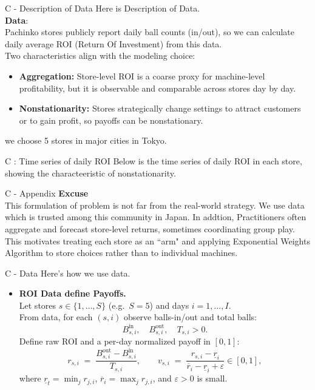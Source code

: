 \documentclass{beamer}
\begin{document}
\begin{frame}{C - Description of Data}
Here is Description of Data.\\
\textbf{Data}:\\
Pachinko stores publicly report daily ball counts (in/out), so we can calculate daily average ROI (Return Of Investment) from this data.\\
\vspace{1em}
Two characteristics align with the modeling choice:
\begin{itemize}
  \item \textbf{Aggregation:} Store-level ROI is a coarse proxy for machine-level profitability, but it is observable and comparable across stores day by day.
  \item \textbf{Nonstationarity:} Stores strategically change settings to attract customers or to gain profit, so payoffs can be nonstationary.
\end{itemize}
we choose 5 stores in major cities in Tokyo.
\end{frame}

\begin{frame}{C : Time series of daily ROI}
Below is the time series of daily ROI in each store, showing the characteeristic of nonstationarity.
    
\end{frame}

\begin{frame}{C - Appendix}
    \textbf{Excuse}\\
    This formulation of problem is not far from the real-world strategy. We use data which is trusted among this community in Japan. In addtion, Practitioners often aggregate and forecast store-level returns, sometimes coordinating group play.\\
    This motivates treating each store as an “arm" and applying Exponential Weights Algorithm to store choices rather than to individual machines. 
\end{frame}

\begin{frame}{C - Data}
    Here's how we use data.\\
    \begin{itemize}
        \item \textbf{ROI Data define Payoffs.}\\
    Let stores $s\in\{1,\dots,S\}$ (e.g.\ $S=5$) and days $i=1,\dots,I$.\\
    From data, for each $(s,i)$ observe balls-in/out and total balls:
    \[
    B^{\text{in}}_{s,i},\quad B^{\text{out}}_{s,i},\quad T_{s,i}>0.
    \]
    Define raw ROI and a per-day normalized payoff in $[0,1]$:
    \[
    r_{s,i}\;=\;\frac{B^{\text{out}}_{s,i}-B^{\text{in}}_{s,i}}{ T_{s,i}},\qquad
    v_{s,i}\;=\;\frac{r_{s,i}-\underline r_i}{\overline r_i-\underline r_i+\varepsilon}\in[0,1],
    \]
    where $\underline r_t=\min_{j} r_{j,i}$, $\overline r_i=\max_{j} r_{j,i}$, and $\varepsilon>0$ is small.
    \end{itemize}
\end{frame}
\end{document}
